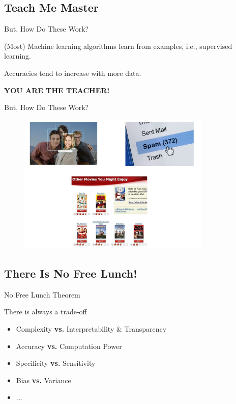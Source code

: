 \documentclass{beamer}
\begin{document}
\subsection{Teach Me Master}
\begin{frame}{But, How Do These Work?}
  		\begin{block}{(Most) Machine learning algorithms learn from examples, i.e., supervised learning.}
  		\end{block}
			 \pause
\vspace{0.3cm}
  		\begin{block}{Accuracies tend to increase with more data.}	
		\end{block} \pause
		\begin{center} \textbf{ \Large{
  		YOU ARE THE TEACHER!
  		} }
	\end{center}	
\end{frame}

\begin{frame}{But, How Do These Work?}
		\begin{figure}
	  		\vspace*{0.0cm}
			\centering
			\includegraphics[trim = 0mm 0mm 0mm 0mm, clip, width=9.2cm]{fbface.jpg}
			\label{fig:res4}
		\end{figure}
\end{frame}
\subsection{There Is No Free Lunch!}
\begin{frame}{No Free Lunch Theorem}
\begin{block}{There is always a trade-off} \pause
\begin{itemize}
\item{Complexity \textbf{vs.} Interpretability \& Transparency}  \pause
\vspace{0.5cm}
\item{Accuracy \textbf{vs.} Computation Power}  \pause
\vspace{0.5cm}
\item{Specificity \textbf{vs.} Sensitivity} \pause
\vspace{0.5cm}
\item{Bias \textbf{vs.} Variance} \pause
\vspace{0.5cm}
\item{...} 
\end{itemize}
\end{block}
\end{frame}
\end{document}
